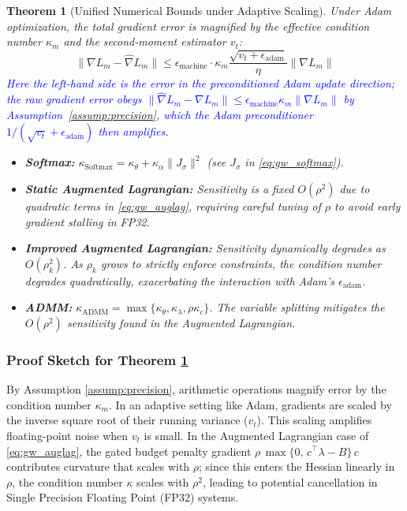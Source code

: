 \documentclass[preprint,12pt,authoryear]{elsarticle}
\newtheorem{theorem}{Theorem}
\begin{document}
\begin{theorem}[Unified Numerical Bounds under Adaptive Scaling]\label{thm:unified_numerical_bounds}
Under Adam optimization, the total gradient error is magnified by the effective condition number $\kappa_m$ and the second-moment estimator $v_t$:
\begin{equation}
    \|\nabla L_m - \hat{\nabla} L_m\| \leq \epsilon_{\text{machine}} \cdot \kappa_m \frac{\sqrt{v_t + \epsilon_{\text{adam}}}}{\eta} \|\nabla L_m\|
\end{equation}
\textcolor{blue}{Here the left-hand side is the error in the preconditioned Adam \emph{update} direction; the raw gradient error obeys $\|\hat{\nabla} L_m-\nabla L_m\|\le\epsilon_{\text{machine}}\kappa_m\|\nabla L_m\|$ by Assumption~\ref{assump:precision}, which the Adam preconditioner $1/(\sqrt{v_t}+\epsilon_{\text{adam}})$ then amplifies.}
\begin{itemize}
    \item \textbf{Softmax:} $\kappa_{\text{Softmax}} = \kappa_\theta + \kappa_\alpha \|J_\sigma\|^2$ (see $J_\sigma$ in \eqref{eq:gw_softmax}).
    \item \textbf{Static Augmented Lagrangian:} Sensitivity is a fixed $O(\rho^2)$ due to quadratic terms in \eqref{eq:gw_auglag}, requiring careful tuning of $\rho$ to avoid early gradient stalling in FP32.
    \item \textbf{Improved Augmented Lagrangian:} Sensitivity dynamically degrades as $O(\rho_k^2)$. As $\rho_k$ grows to strictly enforce constraints, the condition number degrades quadratically, exacerbating the interaction with Adam's $\epsilon_{\text{adam}}$.
    \item \textbf{ADMM:} $\kappa_{\text{ADMM}} = \max\{\kappa_\theta, \kappa_\lambda, \rho\kappa_c\}$. The variable splitting mitigates the $O(\rho^2)$ sensitivity found in the Augmented Lagrangian.
\end{itemize}
\end{theorem}

\subsubsection{Proof Sketch for Theorem \ref{thm:unified_numerical_bounds}}
By Assumption \ref{assump:precision}, arithmetic operations magnify error by the condition number $\kappa_m$. 
In an adaptive setting like Adam, gradients are scaled by the inverse square root of their running variance ($v_t$). This scaling amplifies floating-point noise when $v_t$ is small.
In the Augmented Lagrangian case of \eqref{eq:gw_auglag}, the gated budget penalty gradient $\rho\,\max\{0,\,c^\top\lambda - B\}\,c$ contributes curvature that scales with $\rho$; since this enters the Hessian linearly in $\rho$, the condition number $\kappa$ scales with $\rho^2$, leading to potential cancellation in Single Precision Floating Point (FP32) systems.
\end{document}
